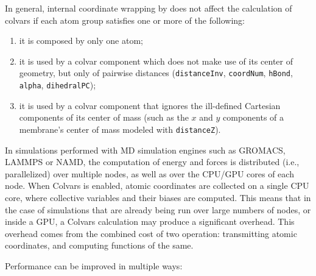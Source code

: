 In general, internal coordinate wrapping by \MDENGINE{} does not affect the calculation of colvars if each atom group satisfies one or more of the following:
\begin{enumerate}
  \item[\emph{i)}] it is composed by only one atom;
  \item[\emph{ii)}] it is used by a colvar component which does not make use of its center of geometry, but only of pairwise distances (\texttt{distanceInv}, \texttt{coordNum}, \texttt{hBond}, \texttt{alpha}, \texttt{dihedralPC});
  \item[\emph{iii)}]  it is used by a colvar component that ignores the ill-defined Cartesian components of its center of mass (such as the $x$ and $y$ components of a membrane's center of mass modeled with \texttt{distanceZ}).
\end{enumerate}



In simulations performed with MD simulation engines such as GROMACS, LAMMPS or NAMD, the computation of energy and forces is distributed (i.e., parallelized) over multiple nodes, as well as over the CPU/GPU cores of each node.
When Colvars is enabled, atomic coordinates are collected on a single CPU core, where collective variables and their biases are computed.
This means that in the case of simulations that are already being run over large numbers of nodes, or inside a GPU, a Colvars calculation may produce a significant overhead.
This overhead comes from the combined cost of two operation: transmitting atomic coordinates, and computing functions of the same.

Performance can be improved in multiple ways:

